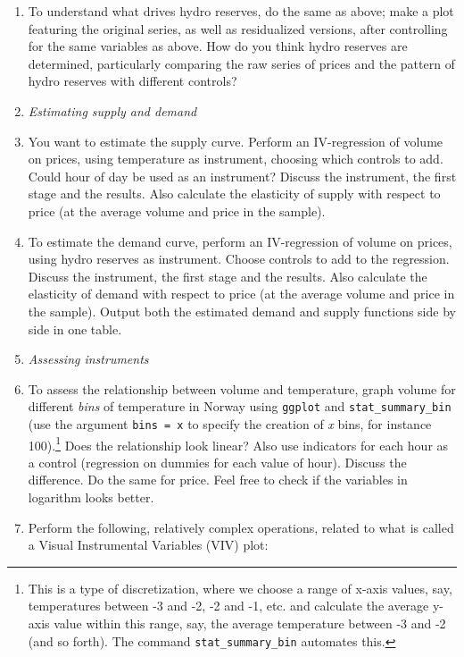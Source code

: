 \documentclass[12pt,a4paper]{article}
\begin{document}
\begin{enumerate}
\item To understand what drives hydro reserves, do the same as above; make a plot featuring the original series, as well as residualized versions, after controlling for the same variables as above. How do you think hydro reserves are determined, particularly comparing the raw series of prices and the pattern of hydro reserves with different controls?
\item[] \emph{Estimating supply and demand}
\item You want to estimate the supply curve. Perform an IV-regression of volume on prices, using temperature as instrument, choosing which controls to add. Could hour of day be used as an instrument? Discuss the instrument, the first stage and the results. Also calculate the elasticity of supply with respect to price (at the average volume and price in the sample).
\item To estimate the demand curve, perform an IV-regression of volume on prices, using hydro reserves as instrument. Choose controls to add to the regression. Discuss the instrument, the first stage and the results. Also calculate the elasticity of demand with respect to price (at the average volume and price in the sample). Output both the estimated demand and supply functions side by side in one table.
\item[] \emph{Assessing instruments}
\item To assess the relationship between volume and temperature, graph volume for different \emph{bins} of temperature in Norway using \texttt{ggplot} and \texttt{stat\_summary\_bin} (use the argument \texttt{bins = x} to specify the creation of \emph{x} bins, for instance 100).\footnote{This is a type of discretization, where we choose a range of x-axis values, say, temperatures between -3 and -2, -2 and -1, etc. and calculate the average y-axis value within this range, say, the average temperature between -3 and -2 (and so forth). The command \texttt{stat\_summary\_bin} automates this.} Does the relationship look linear? Also use indicators for each hour as a control (regression on dummies for each value of hour). Discuss the difference. Do the same for price. Feel free to check if the variables in logarithm looks better.
\item Perform the following, relatively complex operations, related to what is called a Visual Instrumental Variables (VIV) plot:
\begin{enumerate}

\end{enumerate}
\end{enumerate}
\end{document}
